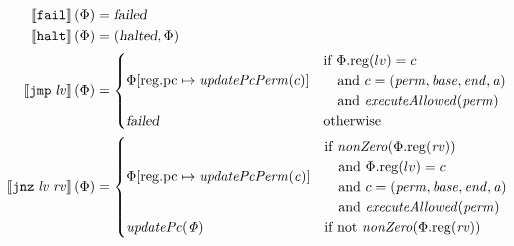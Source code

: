 \documentclass{article}
\newcommand{\update}[2]{[#1 \mapsto #2]}
\newcommand{\sem}[1]{\left\llbracket #1 \right\rrbracket}
\newcommand{\var}[1]{\mathit{#1}}
\newcommand{\rv}{\var{rv}}
\newcommand{\lv}{\var{lv}}
\newcommand{\pcreg}{\mathrm{pc}}
\newcommand{\addr}{\var{a}}
\newcommand{\start}{\var{base}}
\newcommand{\addrend}{\var{end}}
\newcommand{\perm}{\var{perm}}
\newcommand{\plainproj}[1]{\mathrm{#1}}
\newcommand{\memreg}[1][\Phi]{#1.\plainproj{reg}}
\newcommand{\updateReg}[3][\Phi]{#1\update{\plainproj{reg}.#2}{#3}}
\newcommand{\failed}{\textsl{failed}}
\newcommand{\halted}{\textsl{halted}}
\newcommand{\plainfun}[1]{\mathit{#1}}
\newcommand{\updatePcPerm}[1]{\plainfun{updatePcPerm}(#1)}
\newcommand{\executeAllowed}[1]{\plainfun{executeAllowed}(#1)}
\newcommand{\nonZero}[1]{\plainfun{nonZero}(#1)}
\newcommand{\stdUpdatePc}[1]{\plainfun{updatePc(#1)}}
\newcommand{\fail}{\instr{fail}}
\newcommand{\halt}{\instr{halt}}
\newcommand{\instr}[1]{\mathtt{#1}}
\newcommand{\oneinstr}[2]{\instr{#1} \; #2}
\newcommand{\jmp}[1]{\oneinstr{jmp}{#1}}
\newcommand{\twoinstr}[3]{\instr{#1} \; #2 \; #3}
\newcommand{\jnz}[2]{\twoinstr{jnz}{#1}{#2}}
\begin{document}
\begin{align*}
  \sem{\fail}(\Phi)                        & = \failed \\
  \sem{\halt}(\Phi)                        & = (\halted,\Phi) \\
  \sem{\jmp{\lv}}(\Phi)                    & = 
                                             \begin{cases}
                                               \updateReg{\pcreg}{\updatePcPerm{c}} &
                                               \arraycolsep=0pt
                                               \begin{array}{l}
                                                 \text{if }\memreg(lv) = c \\
                                                 \quad\text{and }c=(\perm,\start,\addrend,\addr)\\
                                                 \quad\text{and }\executeAllowed{\perm}
                                               \end{array} \\
                                               \failed                              & \text{otherwise }
                                             \end{cases} \\
  \sem{\jnz{\lv}{\rv}}(\Phi)               & = 
                                             \begin{cases}
                                               \updateReg{\pcreg}{\updatePcPerm{\var{c}}} &
                                               \arraycolsep=0pt
                                               \begin{array}{l}
                                                 \text{if $\nonZero{\memreg(\rv)}$} \\ 
                                                 \quad\text{and $\memreg(lv) = c$} \\
                                                 \quad\text{and $c=(\perm,\start,\addrend,\addr)$}\\
                                                 \quad\text{and $\executeAllowed{\perm}$}
                                               \end{array}
                                               \\ %
                                               \stdUpdatePc{\Phi} & \text{if not $\nonZero{\memreg(\rv)}$}\\

\end{cases}
\end{align*}
\end{document}
